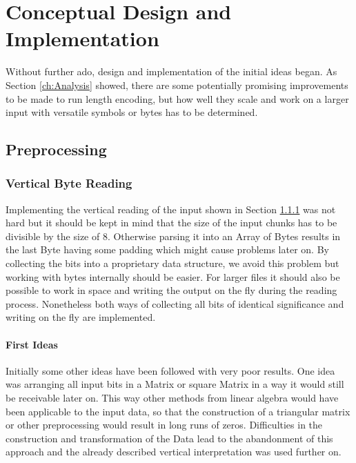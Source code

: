 
\chapter{Conceptual Design and Implementation}
\label{ch:Conceptual Design}
\par{
Without further ado, design and implementation of the initial ideas began. As Section \ref{ch:Analysis} showed, there are some potentially promising improvements to be made to run length encoding, but how well they scale and work on a larger input with versatile symbols or bytes has to be determined.
}
\section{Preprocessing}
\label{ch:Conceptual Design:sec:Preprocessing}

\subsection{Vertical Byte Reading}
\label{ch:Conceptual Design:sec:Parallel Byte Reading}
\par{
Implementing the vertical reading of the input shown in Section \ref*{ch:Conceptual Design:sec:Parallel Byte Reading} was not hard but it should be kept in mind that the size of the input chunks has to be divisible by the size of 8. Otherwise parsing it into an Array of Bytes results in the last Byte having some padding which might cause problems later on.  By collecting the bits into a proprietary data structure, we avoid this problem but working with bytes internally should be easier. For larger files it should also be possible to work in space and writing the output on the fly during the reading process. Nonetheless both ways of collecting all bits of identical significance and writing on the fly are implemented.}

\subsubsection{First Ideas}
\par{
Initially some other ideas have been followed with very poor results. One idea was arranging all input bits in a Matrix or square Matrix in a way it would still be receivable later on. This way other methods from linear algebra would have been applicable to the input data, so that the construction of a triangular matrix or other preprocessing would result in long runs of zeros. Difficulties in the construction and transformation of the Data lead to the abandonment of this approach and the already described vertical interpretation was used further on.}

